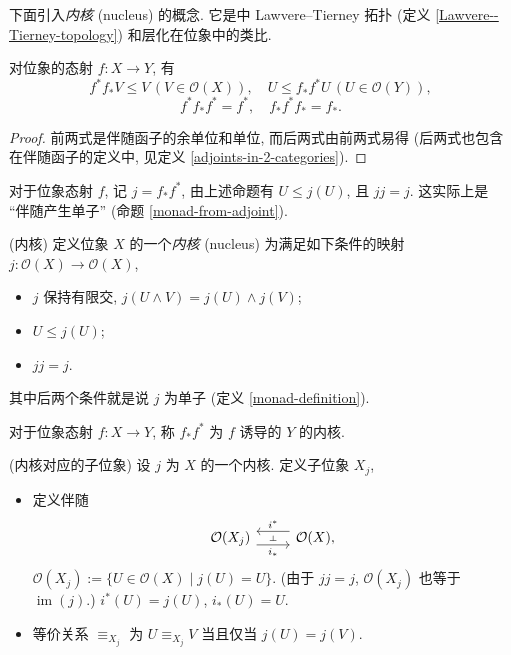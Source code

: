 \newcommand{\nc}{内核}

下面引入\emph{\nc{}} (nucleus) 的概念. 它是\topos{}中 Lawvere--Tierney 拓扑 (定义 \ref{Lawvere--Tierney-topology}) 和层化在位象中的类比.

\begin{prop}
	[label={locale-map-triangular-identities}]
	{}
	对位象的态射 $f\colon X\to Y$, 有
	\[
	f^*f_*V \leq V\,(V\in\mathcal O(X)),\quad U\leq f_*f^* U\,(U\in\mathcal O(Y)),
	\]
	\[
	f^*f_*f^* = f^*,\quad
	f_*f^*f_* = f_*.
	\]
\end{prop}
\begin{proof}
	前两式是伴随函子的余单位和单位, 而后两式由前两式易得 (后两式也包含在伴随函子的定义中, 见定义 \ref{adjoints-in-2-categories}).
\end{proof}
对于位象态射 $f$, 记 $j = f_*f^*$, 由上述命题有 $U\leq j(U)$, 且 $jj=j$. 这实际上是 ``伴随产生单子'' (命题 \ref{monad-from-adjoint}).

\begin{definition}
	[label={nuclei}]
	{(\nc{})}
	定义位象 $X$ 的一个\emph{\nc{}} (nucleus) 为满足如下条件的映射 $j\colon \mathcal O(X)\to \mathcal O(X)$,
	\begin{itemize}
		\item $j$ 保持有限交, $j(U\land V) = j(U)\land j(V)$;
		\item $U\leq j(U)$;
		\item $jj=j$.
	\end{itemize}
	其中后两个条件就是说 $j$ 为单子 (定义 \ref{monad-definition}).
	
	对于位象态射 $f\colon X\to Y$, 称 $f_*f^*$ 为 $f$ 诱导的 $Y$ 的\nc{}.
\end{definition}

\begin{definition}
	[label={nucleus-to-sublocale}]
	{(\nc{}对应的子位象)}
	设 $j$ 为 $X$ 的一个\nc{}.
	定义子位象 $X_j$,
	\begin{itemize}
		\item 定义伴随
		\[\begin{tikzcd}[ampersand replacement=\&]
			{\mathcal O(X_j)} \& {\mathcal O(X),}
			\arrow[""{name=0, anchor=center, inner sep=0}, "{i^*}"', shift right=2, from=1-2, to=1-1]
			\arrow[""{name=1, anchor=center, inner sep=0}, "{i_*}"', shift right=2, from=1-1, to=1-2]
			\arrow["\dashv"{anchor=center, rotate=-90}, draw=none, from=0, to=1]
		\end{tikzcd}\]
		$\mathcal O(X_j) := \{U\in\mathcal O(X)\mid j(U) = U\}$. (由于 $jj=j$, $\mathcal O(X_j)$ 也等于 $\operatorname{im}(j)$.)
		$i^*(U) = j(U)$, $i_*(U) = U$.
		\item 等价关系 $\equiv_{X_j}$ 为 $U\equiv_{X_j} V$ 当且仅当 $j(U)=j(V).$
	\end{itemize}
\end{definition}

